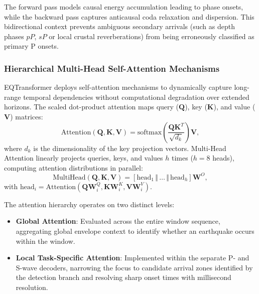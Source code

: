 The forward pass models causal energy accumulation leading to phase onsets, while the backward pass captures anticausal coda relaxation and dispersion. This bidirectional context prevents ambiguous secondary arrivals (such as depth phases $pP$, $sP$ or local crustal reverberations) from being erroneously classified as primary P onsets.

\subsubsection{Hierarchical Multi-Head Self-Attention Mechanisms}
EQTransformer deploys self-attention mechanisms to dynamically capture long-range temporal dependencies without computational degradation over extended horizons. The scaled dot-product attention maps query ($\mathbf{Q}$), key ($\mathbf{K}$), and value ($\mathbf{V}$) matrices:
\begin{equation}
  \mathrm{Attention}(\mathbf{Q}, \mathbf{K}, \mathbf{V}) = \mathrm{softmax}\left( \frac{\mathbf{Q}\mathbf{K}^T}{\sqrt{d_k}} \right) \mathbf{V},
\end{equation}
where $d_k$ is the dimensionality of the key projection vectors. Multi-Head Attention linearly projects queries, keys, and values $h$ times ($h=8$ heads), computing attention distributions in parallel:
\begin{equation}
  \mathrm{MultiHead}(\mathbf{Q}, \mathbf{K}, \mathbf{V}) = \left[ \mathrm{head}_1 \, \Vert \, \dots \, \Vert \, \mathrm{head}_h \right] \mathbf{W}^O,
\end{equation}
with $\mathrm{head}_i = \mathrm{Attention}(\mathbf{Q}\mathbf{W}_i^Q, \mathbf{K}\mathbf{W}_i^K, \mathbf{V}\mathbf{W}_i^V)$.

The attention hierarchy operates on two distinct levels:
\begin{itemize}
  \item \textbf{Global Attention}: Evaluated across the entire window sequence, aggregating global envelope context to identify whether an earthquake occurs within the window.
  \item \textbf{Local Task-Specific Attention}: Implemented within the separate P- and S-wave decoders, narrowing the focus to candidate arrival zones identified by the detection branch and resolving sharp onset times with millisecond resolution.
\end{itemize}

